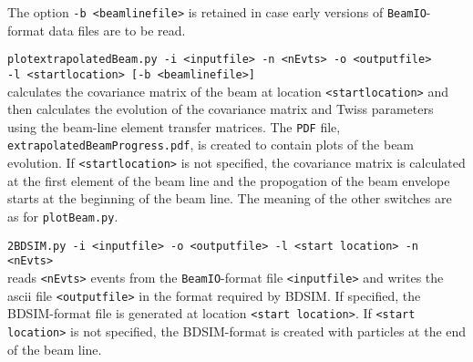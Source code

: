 \begin{description}
    The option \texttt{-b <beamlinefile>} is retained in case early
    versions of \texttt{BeamIO}-format data files are to be read.
  \item{\texttt{plotextrapolatedBeam.py -i <inputfile> -n <nEvts>
    -o <outputfile> \\
    -l <startlocation> [-b <beamlinefile>]}} \\
    calculates the covariance matrix of the beam at
    location \texttt{<startlocation>} and then calculates the
    evolution of the covariance matrix and Twiss parameters using the
    beam-line element transfer matrices.
    The \texttt{PDF} file, \texttt{extrapolatedBeamProgress.pdf}, is
    created to contain plots of the beam evolution.
    If \texttt{<startlocation>} is not specified, the covariance
    matrix is calculated at the first element of the beam line and
    the propogation of the beam envelope starts at the beginning of
    the beam line.
    The meaning of the other switches are as
    for \texttt{plotBeam.py}.
  \item{\texttt{2BDSIM.py -i <inputfile> -o <outputfile> -l <start location>
    -n <nEvts>}} \\
    reads \texttt{<nEvts>} events from the \texttt{BeamIO}-format
    file \texttt{<inputfile>} and writes the ascii
    file \texttt{<output\-file>} in the format required by BDSIM.
    If specified, the BDSIM-format file is generated at
    location \texttt{<start location>}.
    If \texttt{<start location>} is not specified, the BDSIM-format is
    created with particles at the end of the beam line.
\end{description}
